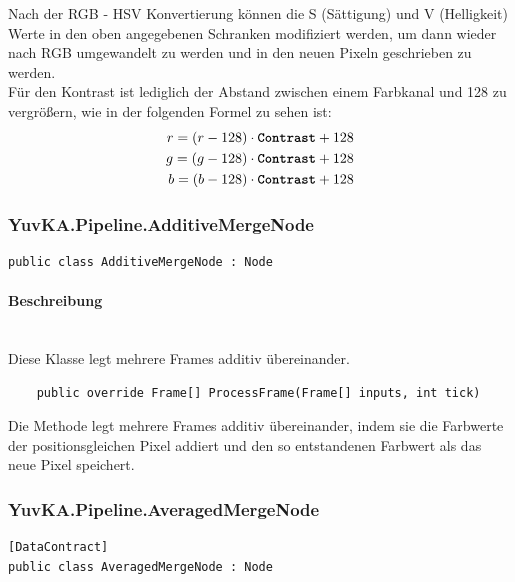\begin{itemize}
	Nach der RGB - HSV Konvertierung können die S (Sättigung) und V (Helligkeit) Werte in den oben angegebenen Schranken modifiziert werden, um dann wieder nach RGB umgewandelt zu werden und in den neuen Pixeln geschrieben zu werden. \\
	Für den Kontrast ist lediglich der Abstand zwischen einem Farbkanal und 128 zu vergrößern, wie in der folgenden Formel zu sehen ist: \begin{eqnarray*}
   r = (r - 128) \cdot \text{\textbf{\texttt{Contrast}}} + 128 \\
	g = (g - 128) \cdot \text{\textbf{\texttt{Contrast}}} + 128 \\
	b = (b - 128) \cdot \text{\textbf{\texttt{Contrast}}} + 128
\end{eqnarray*}

\end{itemize}

\subsubsection{YuvKA.Pipeline.AdditiveMergeNode}

\begin{verbatim}
public class AdditiveMergeNode : Node
\end{verbatim}

\paragraph{Beschreibung}~\\
Diese Klasse  legt mehrere Frames additiv übereinander.

\begin{itemize}

\begin{verbatim}
	public override Frame[] ProcessFrame(Frame[] inputs, int tick)
\end{verbatim}
Die Methode  legt mehrere Frames additiv übereinander, indem sie die Farbwerte der positionsgleichen Pixel addiert und den so entstandenen Farbwert als das neue Pixel speichert.
\end{itemize}

\subsubsection{YuvKA.Pipeline.AveragedMergeNode}

\begin{verbatim}
[DataContract]
public class AveragedMergeNode : Node
\end{verbatim}

